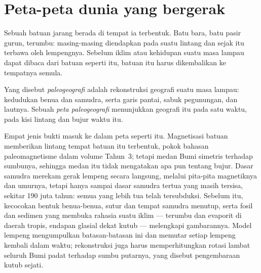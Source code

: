 \section{Peta-peta dunia yang bergerak}\label{sec:b2:phanerozoic-earth:maps}

Sebuah batuan jarang berada di tempat ia terbentuk. Batu bara, batu pasir gurun, terumbu: masing-masing diendapkan pada
suatu lintang dan sejak itu terbawa oleh lempengnya. Sebelum iklim atau kehidupan suatu masa
lampau dapat dibaca dari batuan seperti itu, batuan itu harus dikembalikan ke tempatnya semula.

\begin{definition}\label{def:b2:phanerozoic-earth:palaeogeography}
Yang disebut \emph{paleogeografi} adalah rekonstruksi geografi suatu masa
lampau: kedudukan benua dan samudra, serta garis pantai, sabuk pegunungan, dan
lautnya. Sebuah \emph{peta paleogeografi} menunjukkan geografi itu pada satu
waktu, pada kisi lintang dan bujur waktu itu.
\end{definition}

Empat jenis bukti masuk ke dalam peta seperti itu. Magnetisasi batuan memberikan lintang tempat
batuan itu terbentuk, pokok bahasan paleomagnetisme dalam volume Tahun~3; tetapi medan Bumi
simetris terhadap sumbunya, sehingga medan itu tidak mengatakan apa pun tentang bujur. Dasar samudra merekam gerak
lempeng secara langsung, melalui pita-pita magnetiknya dan umurnya, tetapi hanya sampai
dasar samudra tertua yang masih tersisa, sekitar 190 juta tahun: semua yang lebih tua telah tersubduksi. Sebelum itu,
kecocokan bentuk benua-benua, sutur dan  tempat samudra menutup, serta fosil dan
sedimen yang membuka rahasia suatu iklim --- terumbu dan evaporit di daerah tropis, endapan glasial dekat
kutub --- melengkapi gambarannya. Model lempeng mengumpulkan batasan-batasan ini dan memutar setiap lempeng kembali dalam
waktu; rekonstruksi juga harus memperhitungkan rotasi lambat seluruh Bumi padat terhadap
sumbu putarnya, yang disebut pengembaraan kutub sejati.

